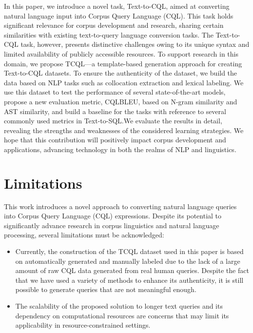 \documentclass[11pt]{article}
\begin{document}
\begin{CJK*}{UTF8}{gbsn}
In this paper, we introduce a novel task, Text-to-CQL, aimed at converting natural language input into Corpus Query Language (CQL). This task holds significant relevance for corpus development and research, sharing certain similarities with existing text-to-query language conversion tasks. The Text-to-CQL task, however, presents distinctive challenges owing to its unique syntax and limited availability of publicly accessible resources. To support research in this domain, we propose TCQL—a template-based generation approach for creating Text-to-CQL datasets. To ensure the authenticity of the dataset, we build the data based on NLP tasks such as collocation extraction and lexical labeling. We use this dataset to test the performance of several state-of-the-art models, propose a new evaluation metric, CQLBLEU, based on N-gram similarity and AST similarity, and build a baseline for the tasks with reference to several commonly used metrics in Text-to-SQL.We evaluate the results in detail, revealing the strengths and weaknesses of the considered learning strategies. We hope that this contribution will positively impact corpus development and applications, advancing technology in both the realms of NLP and linguistics.







\label{sec:bibtex}

\section*{Limitations}
This work introduces a novel approach to converting natural language queries into Corpus Query Language (CQL) expressions. Despite its potential to significantly advance research in corpus linguistics and natural language processing, several limitations must be acknowledged:

\begin{itemize}
    \item Currently, the construction of the TCQL dataset used in this paper is based on automatically generated and manually labeled due to the lack of a large amount of raw CQL data generated from real human queries. Despite the fact that we have used a variety of methods to enhance its authenticity, it is still possible to generate queries that are not meaningful enough.
    \item The scalability of the proposed solution to longer text queries and its dependency on computational resources are concerns that may limit its applicability in resource-constrained settings.
\end{itemize}


\end{CJK*}
\end{document}
